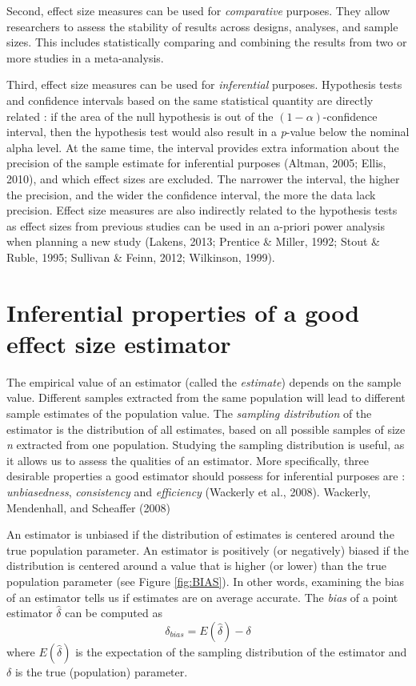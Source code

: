 \documentclass[
  english,
  man,floatsintext]{apa6}
\begin{document}
Second, effect size measures can be used for \emph{comparative} purposes. They allow researchers to assess the stability of results across designs, analyses, and sample sizes. This includes statistically comparing and combining the results from two or more studies in a meta-analysis.

Third, effect size measures can be used for \emph{inferential} purposes. Hypothesis tests and confidence intervals based on the same statistical quantity are directly related : if the area of the null hypothesis is out of the \((1-\alpha)\)-confidence interval, then the hypothesis test would also result in a \emph{p}-value below the nominal alpha level. At the same time, the interval provides extra information about the precision of the sample estimate for inferential purposes (Altman, 2005; Ellis, 2010), and which effect sizes are excluded. The narrower the interval, the higher the precision, and the wider the confidence interval, the more the data lack precision. Effect size measures are also indirectly related to the hypothesis tests as effect sizes from previous studies can be used in an a-priori power analysis when planning a new study (Lakens, 2013; Prentice \& Miller, 1992; Stout \& Ruble, 1995; Sullivan \& Feinn, 2012; Wilkinson, 1999).

\hypertarget{inferential-properties-of-a-good-effect-size-estimator}{%
\section{Inferential properties of a good effect size estimator}\label{inferential-properties-of-a-good-effect-size-estimator}}

The empirical value of an estimator (called the \emph{estimate}) depends on the sample value. Different samples extracted from the same population will lead to different sample estimates of the population value. The \emph{sampling distribution} of the estimator is the distribution of all estimates, based on all possible samples of size \emph{n} extracted from one population. Studying the sampling distribution is useful, as it allows us to assess the qualities of an estimator. More specifically, three desirable properties a good estimator should possess for inferential purposes are : \emph{unbiasedness}, \emph{consistency} and \emph{efficiency} (Wackerly et al., 2008). \color{white} Wackerly, Mendenhall, and Scheaffer (2008)

\color{black}An estimator is unbiased if the distribution of estimates is centered around the true population parameter. An estimator is positively (or negatively) biased if the distribution is centered around a value that is higher (or lower) than the true population parameter (see Figure \ref{fig:BIAS}). In other words, examining the bias of an estimator tells us if estimates are on average accurate. The \emph{bias} of a point estimator \(\hat{\delta}\) can be computed as
\begin{equation} 
\delta_{bias}=E(\hat{\delta})-\delta
\label{eqn:BIAS}
\end{equation}
where \(E(\hat{\delta})\) is the expectation of the sampling distribution of the estimator and \(\delta\) is the true (population) parameter.
\end{document}
